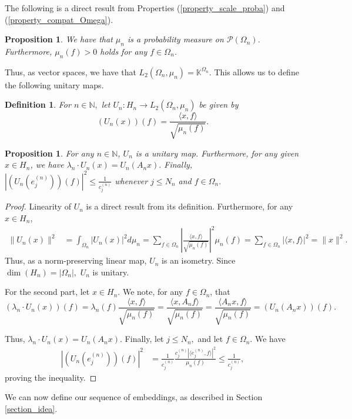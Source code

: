 \documentclass[10pt,a4paper]{amsart}
\newtheorem{prop}[thm]{Proposition}
\newtheorem{definition}[thm]{Definition}
\def \LL{\langle}
\def \RR{\rangle}
\begin{document}
The following is a direct result from Properties (\ref{property_scale_proba}) and (\ref{property_compat_Omega}).
\begin{prop}
	We have that $\mu_n$ is a probability measure on $\mathcal{P}(\Omega_n)$. Furthermore, $\mu_n(f)>0$ holds for any $f\in\Omega_n$.
\end{prop}

Thus, as vector spaces, we have that $L_2(\Omega_n,\mu_n)=\mathbb{K}^{\Omega_n}$. This allows us to define the following unitary maps.

\begin{definition}
	For $n\in\mathbb{N},$ let $U_n:H_n\rightarrow L_2(\Omega_n,\mu_n)$ be given by $$(U_n(x))(f)=\frac{\LL x, f\RR}{\sqrt{\mu_n(f)}}.$$
\end{definition}
\begin{prop}\label{proposition_finite_isometry}
	For any $n\in\mathbb{N}$, $U_n$ is a unitary map. Furthermore, for any given $x\in H_n$, we have $\lambda_n\cdot U_n(x)=U_n(A_nx).$ Finally, $|(U_n(e_j^{(n)}))(f)|^2\leq \frac{1}{c_j^{(n)}}$ whenever $j\leq N_n$ and $f\in\Omega_n.$
\end{prop}
\begin{proof}
	Linearity of $U_n$ is a direct result from its definition. Furthermore, for any $x\in H_n$, 
	\begin{align*}
		\|U_n(x)\|^2&=\int_{\Omega_n}|U_n(x)|^2d\mu_n=\sum_{f\in\Omega_n}\left|\frac{\LL x, f\RR}{\sqrt{\mu_n(f)}}\right|^2\mu_n(f)=\sum_{f\in\Omega_n}|\LL x,f\RR|^2=\|x\|^2.
	\end{align*}
	Thus, as a norm-preserving linear map, $U_n$ is an isometry. Since $\dim(H_n)=|\Omega_n|,$ $U_n$ is unitary.
	
	For the second part, let $x\in H_n.$ We note, for any $f\in\Omega_n$, that $$(\lambda_n\cdot U_n(x))(f)=\lambda_n(f)\frac{\LL x,f\RR}{\sqrt{\mu_n(f)}}=\frac{\LL x, A_n f\RR}{\sqrt{\mu_n(f)}}=\frac{\LL A_nx, f\RR}{\sqrt{\mu_n(f)}}=(U_n(A_nx))(f). $$
	
	Thus, $\lambda_n\cdot U_n(x)=U_n(A_nx).$ Finally, let $j\leq N_n,$ and let $f\in\Omega_n.$ We have
	\begin{align*}
		|(U_n(e_j^{(n)}))(f)|^2&=\frac{1}{c_j^{(n)}}\frac{c_j^{(n)}|\LL e_j^{(n)}, f\RR|^2}{\mu_n(f)}\leq \frac{1}{c_j^{(n)}},
	\end{align*}
	proving the inequality.
\end{proof}

We can now define our sequence of embeddings, as described in Section \ref{section_idea}.
\end{document}
